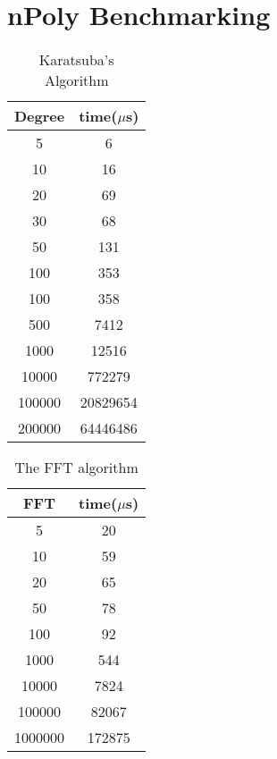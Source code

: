 \chapter{nPoly Benchmarking}
\label{appendix1}

\begin{table}[h]
\centering
    \begin{tabular}{|c| c |}
        \hline
        Degree & time($\mu$s)\\
        \hline
        5 & 6 \\
        10 & 16 \\
        20 & 69\\
        30 & 68\\
        50 & 131 \\
        100 & 353 \\
        100 & 358\\
        500 & 7412 \\
        1000 & 12516\\
        10000 & 772279\\
        100000 & 20829654\\
        200000 & 64446486\\
        \hline
    \end{tabular}
    \caption{Karatsuba's Algorithm}
\end{table}

\begin{table}[h]
\centering
    \begin{tabular}{|c| c |}
        \hline
        FFT & time($\mu$s)\\
        \hline
        5 & 20\\
        10 & 59\\
        20 & 65\\
        50 & 78\\
        100 & 92\\
        1000 & 544\\
        10000 & 7824\\
        100000 & 82067\\
        1000000 & 172875\\
        \hline
    \end{tabular}
    \caption{The FFT algorithm}
\end{table}

